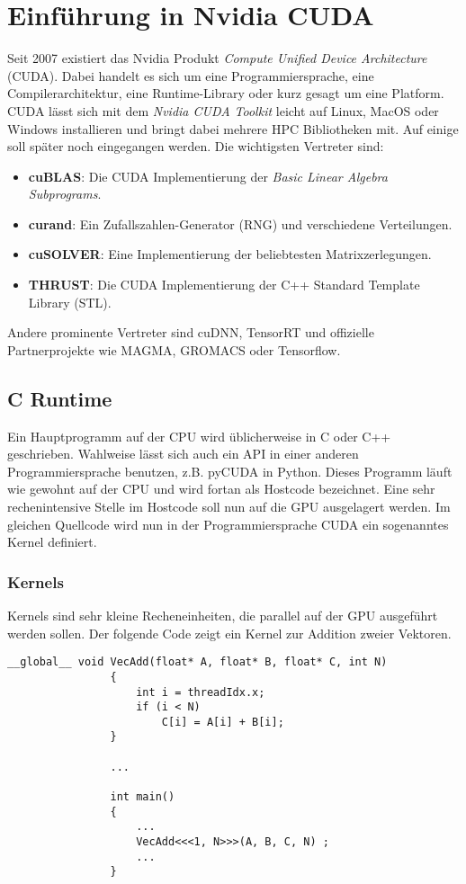 	\chapter{Einf\"uhrung in Nvidia CUDA}
	Seit 2007 existiert das Nvidia Produkt \textit{Compute Unified Device Architecture} (CUDA). Dabei handelt es sich um eine Programmiersprache, eine Compilerarchitektur, eine Runtime-Library oder kurz gesagt um eine Platform. CUDA lässt sich mit dem \textit{Nvidia CUDA Toolkit} leicht auf Linux, MacOS oder Windows installieren und bringt dabei mehrere HPC Bibliotheken mit. Auf einige soll später noch eingegangen werden. Die wichtigsten Vertreter sind:
	\begin{itemize}
		\item \textbf{cuBLAS}:   Die CUDA Implementierung der \textit{Basic Linear Algebra Subprograms}.
		\item \textbf{curand}:   Ein Zufallszahlen-Generator (RNG) und verschiedene Verteilungen.
		\item \textbf{cuSOLVER}: Eine Implementierung der beliebtesten Matrixzerlegungen.
		\item \textbf{THRUST}:   Die CUDA Implementierung der C++ Standard Template Library (STL).
	\end{itemize}
	Andere prominente Vertreter sind cuDNN, TensorRT und offizielle Partnerprojekte wie MAGMA, GROMACS oder Tensorflow.
				
		
		\section{C Runtime}
		Ein Hauptprogramm auf der CPU wird üblicherweise in C oder C++ geschrieben. Wahlweise lässt sich auch ein \Gls{API} in einer anderen Programmiersprache benutzen, z.B. pyCUDA in Python. Dieses Programm läuft wie gewohnt auf der CPU und wird fortan als Hostcode bezeichnet. Eine sehr rechenintensive Stelle im  Hostcode soll nun auf die GPU ausgelagert werden. Im gleichen Quellcode wird nun in der Programmiersprache CUDA ein sogenanntes \Gls{Kernel} definiert.
			\subsection*{Kernels}
			\Glspl{Kernel} sind sehr kleine Recheneinheiten, die parallel auf der GPU ausgeführt werden sollen. Der folgende Code zeigt ein \Gls{Kernel} zur Addition zweier Vektoren.
	  		\begin{lstlisting}[caption=~Vektoraddition Kernel]
				__global__ void VecAdd(float* A, float* B, float* C, int N)
				{
    				int i = threadIdx.x;
    				if (i < N)
        				C[i] = A[i] + B[i];
				}
				
				...
				
				int main()
				{		
					...
					VecAdd<<<1, N>>>(A, B, C, N) ;
					...
				}
			\end{lstlisting}
			
